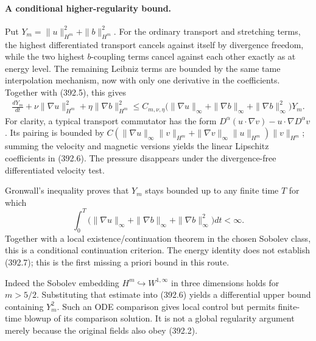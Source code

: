 \documentclass[11pt]{article}
\begin{document}
\paragraph{A conditional higher-regularity bound.}
Put $Y_m=\|u\|_{H^m}^2+\|b\|_{H^m}^2$. For the ordinary
transport and stretching terms, the highest differentiated
transport cancels against itself by divergence freedom, while the
two highest $b$-coupling terms cancel against each other exactly
as at energy level. The remaining Leibniz terms are bounded by
the same tame interpolation mechanism, now with only one derivative
in the coefficients. Together with (392.5), this gives
\[
 \begin{split}
 \frac{dY_m}{dt}
   +\nu\|\nabla u\|_{H^m}^2+\eta\|\nabla b\|_{H^m}^2
 \leq C_{m,\nu,\eta}
  \bigl(\|\nabla u\|_\infty+\|\nabla b\|_\infty
                      +\|\nabla b\|_\infty^2\bigr)Y_m.
 \end{split}
 \tag{392.6}
\]
For clarity, a typical transport commutator has the form
$D^\alpha(u\cdot\nabla v)-u\cdot\nabla D^\alpha v$.
Its pairing is bounded by
$C(\|\nabla u\|_\infty\|v\|_{H^m}
+\|\nabla v\|_\infty\|u\|_{H^m})\|v\|_{H^m}$;
summing the velocity and magnetic versions yields the linear
Lipschitz coefficients in (392.6). The pressure disappears under
the divergence-free differentiated velocity test.

Gronwall's inequality proves that $Y_m$ stays bounded up to any
finite time $T$ for which
\[
 \int_0^T\bigl(\|\nabla u\|_\infty+
               \|\nabla b\|_\infty+\|\nabla b\|_\infty^2\bigr)dt<\infty.
 \tag{392.7}
\]
Together with a local existence/continuation theorem in the chosen
Sobolev class, this is a conditional continuation criterion. The
energy identity does not establish (392.7); this is the first
missing a priori bound in this route.

Indeed the Sobolev embedding $H^m\hookrightarrow W^{1,\infty}$
in three dimensions holds for $m>5/2$. Substituting that estimate
into (392.6) yields a differential upper bound containing $Y_m^2$.
Such an ODE comparison gives local control but permits finite-time
blowup of its comparison solution. It is not a global regularity
argument merely because the original fields also obey (392.2).
\end{document}
